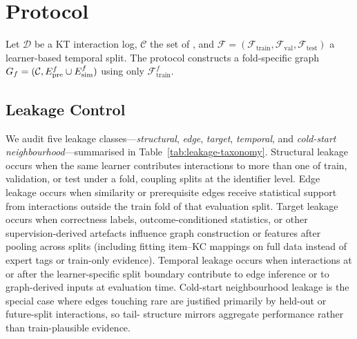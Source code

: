 \section{Protocol}
\label{sec:protocol}
Let $\mathcal{D}$ be a KT interaction log, $\mathcal{C}$ the set of
\KCs{}, and $\mathcal{F}=(\mathcal{F}_{\text{train}},
\mathcal{F}_{\text{val}},\mathcal{F}_{\text{test}})$ a learner-based
temporal split. The protocol constructs a fold-specific graph
$G_f=(\mathcal{C},E_{\text{pre}}^f\cup E_{\text{sim}}^f)$ using only
$\mathcal{F}_{\text{train}}^f$.
\subsection{Leakage Control}
\label{sec:leakage}
We audit five leakage classes---\emph{structural}, \emph{edge}, \emph{target},
\emph{temporal}, and \emph{cold-start neighbourhood}---summarised in
Table~\ref{tab:leakage-taxonomy}. Structural leakage occurs when the same
learner contributes interactions to more than one of train, validation, or test under a fold, coupling splits at the identifier level. Edge leakage occurs when similarity or
prerequisite edges receive statistical support from interactions
outside the train fold of that evaluation split. Target leakage occurs
when correctness labels, outcome-conditioned statistics, or other
supervision-derived artefacts influence graph construction or features
after pooling across splits (including fitting item--KC mappings on
full data instead of expert tags or train-only evidence). Temporal
leakage occurs when interactions at or after the learner-specific split
boundary contribute to edge inference or to graph-derived inputs at
evaluation time. Cold-start neighbourhood leakage is the special case
where edges touching rare \KCs{} are justified primarily by held-out or
future-split interactions, so tail-\KC{} structure mirrors aggregate
performance rather than train-plausible evidence.

